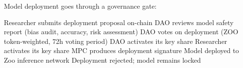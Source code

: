 Model deployment goes through a governance gate:

\begin{algorithm}[t]
\caption{Model Deployment with MPC Governance}
\label{alg:deploy}
\begin{algorithmic}[1]
\STATE Researcher submits deployment proposal on-chain
\STATE DAO reviews model safety report (bias audit, accuracy, risk assessment)
\STATE DAO votes on deployment (ZOO token-weighted, 72h voting period)
    \STATE DAO activates its key share
    \STATE Researcher activates its key share
    \STATE MPC produces deployment signature
    \STATE Model deployed to Zoo inference network
\ELSE
    \STATE Deployment rejected; model remains locked
\ENDIF
\end{algorithmic}
\end{algorithm}

